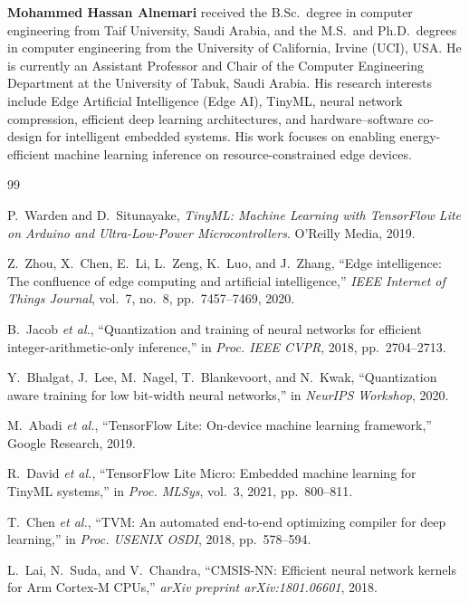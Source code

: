\documentclass[10pt,twocolumn]{article}
\begin{document}
\vspace{6pt}
\noindent\textbf{Mohammed Hassan Alnemari} received the B.Sc.\ degree in computer engineering from Taif University, Saudi Arabia, and the M.S.\ and Ph.D.\ degrees in computer engineering from the University of California, Irvine (UCI), USA. He is currently an Assistant Professor and Chair of the Computer Engineering Department at the University of Tabuk, Saudi Arabia. His research interests include Edge Artificial Intelligence (Edge AI), TinyML, neural network compression, efficient deep learning architectures, and hardware--software co-design for intelligent embedded systems. His work focuses on enabling energy-efficient machine learning inference on resource-constrained edge devices.

\begin{thebibliography}{99}

P.~Warden and D.~Situnayake, \textit{TinyML: Machine Learning with TensorFlow Lite on Arduino and Ultra-Low-Power Microcontrollers}. O'Reilly Media, 2019.

Z.~Zhou, X.~Chen, E.~Li, L.~Zeng, K.~Luo, and J.~Zhang, ``Edge intelligence: The confluence of edge computing and artificial intelligence,'' \textit{IEEE Internet of Things Journal}, vol.~7, no.~8, pp.~7457--7469, 2020.

B.~Jacob \textit{et al.}, ``Quantization and training of neural networks for efficient integer-arithmetic-only inference,'' in \textit{Proc. IEEE CVPR}, 2018, pp.~2704--2713.

Y.~Bhalgat, J.~Lee, M.~Nagel, T.~Blankevoort, and N.~Kwak, ``Quantization aware training for low bit-width neural networks,'' in \textit{NeurIPS Workshop}, 2020.

M.~Abadi \textit{et al.}, ``TensorFlow Lite: On-device machine learning framework,'' Google Research, 2019.

R.~David \textit{et al.}, ``TensorFlow Lite Micro: Embedded machine learning for TinyML systems,'' in \textit{Proc. MLSys}, vol.~3, 2021, pp.~800--811.

T.~Chen \textit{et al.}, ``TVM: An automated end-to-end optimizing compiler for deep learning,'' in \textit{Proc. USENIX OSDI}, 2018, pp.~578--594.

L.~Lai, N.~Suda, and V.~Chandra, ``CMSIS-NN: Efficient neural network kernels for Arm Cortex-M CPUs,'' \textit{arXiv preprint arXiv:1801.06601}, 2018.


\end{thebibliography}
\end{document}
